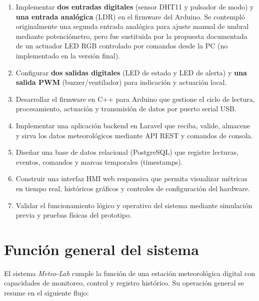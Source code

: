 \begin{enumerate}[leftmargin=*]
    \item Implementar \textbf{dos entradas digitales} (sensor DHT11 y pulsador de modo) y \textbf{una entrada analógica} (LDR) en el firmware del Arduino. Se contempló originalmente una segunda entrada analógica para ajuste manual de umbral mediante potenciómetro, pero fue sustituida por la propuesta documentada de un actuador LED RGB controlado por comandos desde la PC (no implementado en la versión final).
    \item Configurar \textbf{dos salidas digitales} (LED de estado y LED de alerta) y \textbf{una salida PWM} (buzzer/ventilador) para indicación y actuación local.
    \item Desarrollar el firmware en C++ para Arduino que gestione el ciclo de lectura, procesamiento, actuación y transmisión de datos por puerto serial USB.
    \item Implementar una aplicación backend en Laravel que reciba, valide, almacene y sirva los datos meteorológicos mediante API REST y comandos de consola.
    \item Diseñar una base de datos relacional (PostgreSQL) que registre lecturas, eventos, comandos y marcas temporales (timestamps).
    \item Construir una interfaz HMI web responsiva que permita visualizar métricas en tiempo real, históricos gráficos y controles de configuración del hardware.
    \item Validar el funcionamiento lógico y operativo del sistema mediante simulación previa y pruebas físicas del prototipo.
\end{enumerate}

\label{ch:descripcion-sistema}

\section{Función general del sistema}

El sistema \textit{Meteo-Lab} cumple la función de una estación meteorológica digital con capacidades de monitoreo, control y registro histórico. Su operación general se resume en el siguiente flujo:

